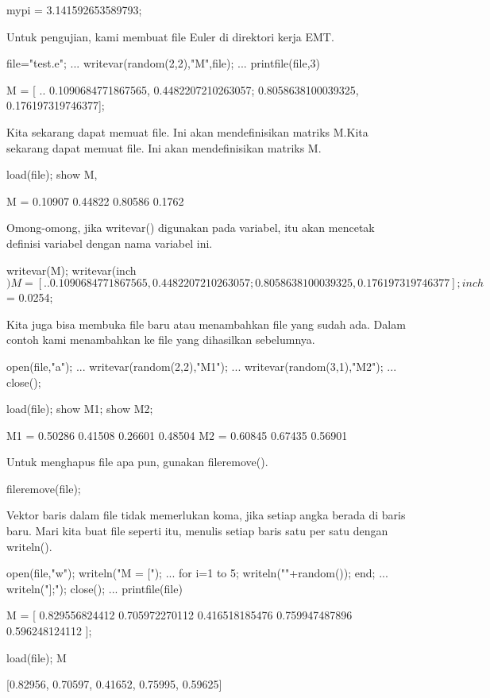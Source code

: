 \documentclass{article}
\begin{document}
    mypi = 3.141592653589793;

Untuk pengujian, kami membuat file Euler di direktori kerja EMT.


\>file="test.e"; ...  
\>   writevar(random(2,2),"M",file); ...  
\>   printfile(file,3)


    M = [ ..
    0.1090684771867565, 0.4482207210263057;
    0.8058638100039325, 0.176197319746377];

Kita sekarang dapat memuat file. Ini akan mendefinisikan matriks
M.Kita sekarang dapat memuat file. Ini akan mendefinisikan matriks M.


\>load(file); show M,


    M = 
      0.10907   0.44822 
      0.80586    0.1762 

Omong-omong, jika writevar() digunakan pada variabel, itu akan
mencetak definisi variabel dengan nama variabel ini.


\>writevar(M); writevar(inch$)


    M = [ ..
    0.1090684771867565, 0.4482207210263057;
    0.8058638100039325, 0.176197319746377];
    inch$ = 0.0254;

Kita juga bisa membuka file baru atau menambahkan file yang sudah ada.
Dalam contoh kami menambahkan ke file yang dihasilkan sebelumnya.


\>open(file,"a"); ...  
\>   writevar(random(2,2),"M1"); ...  
\>   writevar(random(3,1),"M2"); ...  
\>   close();

\>load(file); show M1; show M2;


    M1 = 
      0.50286   0.41508 
      0.26601   0.48504 
    M2 = 
      0.60845 
      0.67435 
      0.56901 

Untuk menghapus file apa pun, gunakan fileremove().


\>fileremove(file);


Vektor baris dalam file tidak memerlukan koma, jika setiap angka
berada di baris baru. Mari kita buat file seperti itu, menulis setiap
baris satu per satu dengan writeln().


\>open(file,"w"); writeln("M = ["); ...  
\>   for i=1 to 5; writeln(""+random()); end; ...  
\>   writeln("];"); close(); ...  
\>   printfile(file)


    M = [
    0.829556824412
    0.705972270112
    0.416518185476
    0.759947487896
    0.596248124112
    ];

\>load(file); M


    [0.82956,  0.70597,  0.41652,  0.75995,  0.59625]
\end{document}
